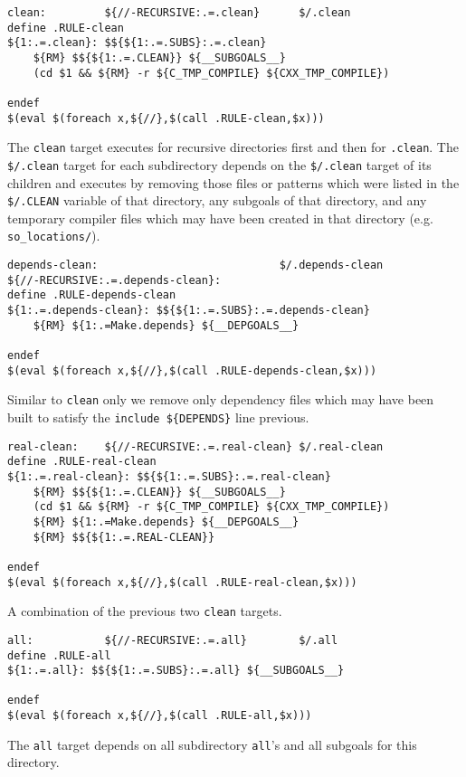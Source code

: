 \documentclass[letterpaper]{article}
\begin{document}
\begin{verbatim}
clean:         ${//-RECURSIVE:.=.clean}      $/.clean
define .RULE-clean
${1:.=.clean}: $${${1:.=.SUBS}:.=.clean}
	${RM} $${${1:.=.CLEAN}} ${__SUBGOALS__}
	(cd $1 && ${RM} -r ${C_TMP_COMPILE} ${CXX_TMP_COMPILE})

endef
$(eval $(foreach x,${//},$(call .RULE-clean,$x)))
\end{verbatim}
The \verb+clean+ target executes for recursive directories first
and then for \verb+.clean+.  The \verb+$/.clean+ target for
each subdirectory depends on the \verb+$/.clean+ target of its
children and executes by removing those files or patterns which were listed
in the \verb+$/.CLEAN+ variable of that directory, any subgoals of
that directory, and any temporary compiler files which may have been
created in that directory (e.g. \verb+so_locations/+).

\begin{verbatim}
depends-clean:                            $/.depends-clean
${//-RECURSIVE:.=.depends-clean}:
define .RULE-depends-clean
${1:.=.depends-clean}: $${${1:.=.SUBS}:.=.depends-clean}
	${RM} ${1:.=Make.depends} ${__DEPGOALS__}

endef
$(eval $(foreach x,${//},$(call .RULE-depends-clean,$x)))
\end{verbatim}
Similar to \verb+clean+ only we remove only dependency files which
may have been built to satisfy the \verb+include ${DEPENDS}+ line
previous.

\begin{verbatim}
real-clean:    ${//-RECURSIVE:.=.real-clean} $/.real-clean
define .RULE-real-clean
${1:.=.real-clean}: $${${1:.=.SUBS}:.=.real-clean}
	${RM} $${${1:.=.CLEAN}} ${__SUBGOALS__}
	(cd $1 && ${RM} -r ${C_TMP_COMPILE} ${CXX_TMP_COMPILE})
	${RM} ${1:.=Make.depends} ${__DEPGOALS__}
	${RM} $${${1:.=.REAL-CLEAN}}

endef
$(eval $(foreach x,${//},$(call .RULE-real-clean,$x)))
\end{verbatim}
A combination of the previous two \verb+clean+ targets.

\begin{verbatim}
all:           ${//-RECURSIVE:.=.all}        $/.all
define .RULE-all
${1:.=.all}: $${${1:.=.SUBS}:.=.all} ${__SUBGOALS__}

endef
$(eval $(foreach x,${//},$(call .RULE-all,$x)))
\end{verbatim}
The \verb+all+ target depends on all subdirectory \verb+all+'s
and all subgoals for this directory.
\end{document}
